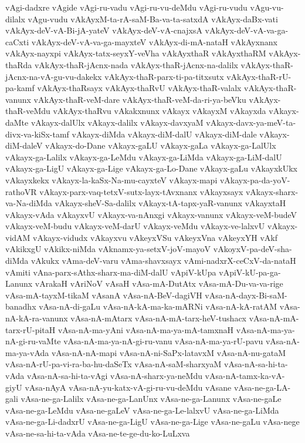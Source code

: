 {vAgi-dadxre
vAgide
vAgi-ru-vadu
vAgi-ru-vu-deMdu
vAgi-ru-vudu
vAgu-vu-dilalx
vAgu-vudu
vAkAyxM-ta-rA-saM-Ba-va-ta-satxdA
vAkAyx-daBx-vati
vAkAyx-deV-vA-Bi-jA-yateV
vAkAyx-deV-vA-cnajxsA
vAkAyx-deV-vA-va-ga-caCxti
vAkAyx-deV-vA-va-ga-mayxteV
vAkAyx-di-mA-nataH
vAkAyxnanx
vAkAyx-nayxpi
vAkAyx-tatx-seyxY-veVha
vAkAyxthaR
vAkAyxthaRM
vAkAyx-thaRda
vAkAyx-thaR-jAcnx-nada
vAkAyx-thaR-jAcnx-na-dalilx
vAkAyx-thaR-jAcnx-na-vA-gu-vu-dakekx
vAkAyx-thaR-parx-ti-pa-titxsutx
vAkAyx-thaR-rU-pa-kamf
vAkAyx-thaRsayx
vAkAyx-thaRvU
vAkAyx-thaR-valalx
vAkAyx-thaR-vanunx
vAkAyx-thaR-veM-dare
vAkAyx-thaR-veM-da-ri-ya-beVku
vAkAyx-thaR-veMdu
vAkAyx-thaRvu
vAkakxnunx
vAkayx
vAkayxM
vAkayxda
vAkayx-daMte
vAkayx-dalUlx
vAkayx-dalilx
vAkayx-davxyaM
vAkayx-davx-ya-meV-ta-divx-va-kiSx-tamf
vAkayx-diMda
vAkayx-diM-dalU
vAkayx-diM-dale
vAkayx-diM-daleV
vAkayx-do-Dane
vAkayx-gaLU
vAkayx-gaLa
vAkayx-ga-LalUlx
vAkayx-ga-Lalilx
vAkayx-ga-LeMdu
vAkayx-ga-LiMda
vAkayx-ga-LiM-dalU
vAkayx-ga-LigU
vAkayx-ga-Lige
vAkayx-ga-Lo-Dane
vAkayx-gaLu
vAkayxkUkx
vAkayxkekx
vAkayx-la-kaSx-Na-mu-cayxteV
vAkayx-mapi
vAkayx-pa-da-yoV-rathoVR
vAkayx-parx-vaq-tetxV-sutx-layx-tAvxnanx
vAkayxsayx
vAkayx-sharx-va-Na-diMda
vAkayx-sheV-Sa-dalilx
vAkayx-tA-tapx-yaR-vanunx
vAkayxtaH
vAkayx-vAda
vAkayxvU
vAkayx-va-nAnxgi
vAkayx-vanunx
vAkayx-veM-budeV
vAkayx-veM-budu
vAkayx-veM-darU
vAkayx-veMdu
vAkayx-ve-lalxvU
vAkayx-vidAM
vAkayx-vidudx
vAkayxvu
vAkeyxVSu
vAkeyxVna
vAkeyxYH
vAkf
vAkikxgU
vAkikx-niMda
vAknamx-ya-setxV-joV-mayoV
vAkoyxV-pa-deV-sha-diMda
vAkukx
vAma-deV-varu
vAma-shavxsayx
vAmi-nadxrX-ceCxV-da-nataH
vAmiti
vAna-parx-sAthx-sharx-ma-diM-dalU
vApiV-kUpa
vApiV-kU-pa-ga-Lanunx
vArakaH
vAriNoV
vAsaH
vAsa-mA-DutAtx
vAsa-mA-Du-va-va-rige
vAsa-mA-tayxM-tikaM
vAsanA
vAsa-nA-BeV-dagiVH
vAsa-nA-dayx-Bi-saM-banadhx
vAsa-nA-di-gaLu
vAsa-nA-kA-ma-ka-mARNi
vAsa-nA-kA-ratAM
vAsa-nA-kA-ra-vanunx
vAsa-nA-mAtarx
vAsa-nA-mA-tarx-heV-tushacx
vAsa-nA-mA-tarx-rU-pitaH
vAsa-nA-ma-yAni
vAsa-nA-ma-ya-mA-tamxnaH
vAsa-nA-ma-ya-nA-gi-ru-vaMte
vAsa-nA-ma-ya-nA-gi-ru-vanu
vAsa-nA-ma-ya-rU-pavu
vAsa-nA-ma-ya-vAda
vAsa-nA-nA-mapi
vAsa-nA-ni-SaPx-latavxM
vAsa-nA-nu-gataM
vAsa-nA-rU-pa-vi-ra-ba-hu-daSeTx
vAsa-nA-saM-sharxyaM
vAsa-nA-sa-hi-ta-vAda
vAsa-nA-sa-hi-ta-vAgi
vAsa-nA-sharx-ya-neMdu
vAsa-nA-tamx-ka-vA-giyU
vAsa-nAyA
vAsa-nA-yu-katx-vA-gi-ru-vu-deMdu
vAsane
vAsa-ne-ga-LA-gali
vAsa-ne-ga-Lalilx
vAsa-ne-ga-LanUnx
vAsa-ne-ga-Lanunx
vAsa-ne-gaLe
vAsa-ne-ga-LeMdu
vAsa-ne-gaLeV
vAsa-ne-ga-Le-lalxvU
vAsa-ne-ga-LiMda
vAsa-ne-ga-Li-dadxrU
vAsa-ne-ga-LigU
vAsa-ne-ga-Lige
vAsa-ne-gaLu
vAsa-nege
vAsa-ne-sa-hi-ta-vAda
vAsa-ne-te-ge-du-ko-LuLxva
}
